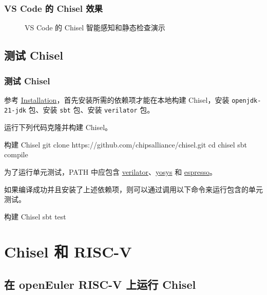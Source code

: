 \documentclass[xcolor=table,dvipsnames,svgnames,aspectratio=169]{ctexbeamer}
\begin{document}
\begin{frame}
  \frametitle{VS Code 的 Chisel 效果}
  \begin{figure}
    \centering
    \caption{VS Code 的 Chisel 智能感知和静态检查演示}
  \end{figure}
\end{frame}

\subsection{测试 Chisel}

\begin{frame}
  \frametitle{测试 Chisel}
  参考 \href{https://www.chisel-lang.org/docs/installation}{Installation}，首先安装所需的依赖项才能在本地构建 Chisel，安装 \lstinline|openjdk-21-jdk| 包、安装 \lstinline|sbt| 包、安装 \lstinline|verilator| 包。

  运行下列代码克隆并构建 Chisel。

  \begin{codeblock}[language=bash]{构建 Chisel}
git clone https://github.com/chipsalliance/chisel.git
cd chisel
sbt compile
  \end{codeblock}

  为了运行单元测试，PATH 中应包含 \href{https://www.veripool.org/verilator/}{verilator}、\href{https://yosyshq.net/yosys/}{yosys} 和 \href{https://github.com/chipsalliance/espresso}{espresso}。

  \newpage

  如果编译成功并且安装了上述依赖项，则可以通过调用以下命令来运行包含的单元测试。

  \begin{codeblock}[language=bash]{构建 Chisel}
sbt test
  \end{codeblock}
\end{frame}

\section{Chisel 和 RISC-V}

\subsection{在 openEuler RISC-V 上运行 Chisel}
\end{document}
